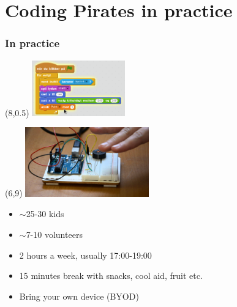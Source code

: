 \documentclass{beamer}
\begin{document}
\section{Coding Pirates in practice}
\begin{frame}
\frametitle{In practice}

\begin{textblock}{20}(8,0.5)
 \includegraphics[width=0.3\textwidth]{imagery/scratch}
\end{textblock}

\begin{textblock}{20}(6,9)
  \includegraphics[width=0.4\textwidth]{imagery/arduino-theremin}
\end{textblock}

\begin{itemize}
\item $\sim$25-30 kids
\item $\sim$7-10 volunteers
\item 2 hours a week, usually 17:00-19:00
\item 15 minutes break with snacks, cool aid, fruit etc.
\item Bring your own device (BYOD)
\end{itemize}
\vspace{2cm}

\end{frame}
\end{document}
